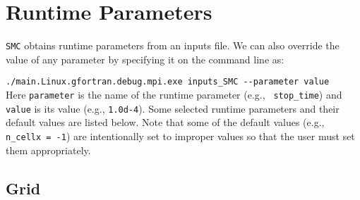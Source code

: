 \documentclass[11pt,letterpaper]{article}
\begin{document}
\section{Runtime Parameters}

{\tt SMC} obtains runtime parameters from an inputs file.  We can also
override the value of any parameter by specifying it on the
command line as:\vspace{5pt}

\verb|./main.Linux.gfortran.debug.mpi.exe inputs_SMC --parameter value|\\

Here {\tt parameter} is the name of the runtime parameter (e.g., {\tt
  stop\_time}) and {\tt value} is its value (e.g., {\tt 1.0d-4}).
Some selected runtime parameters and their default values are listed
below.  Note that some of the default values (e.g., {\tt n\_cellx =
  -1}) are intentionally set to improper values so that the user must
set them appropriately.

\subsection{Grid}
\end{document}
